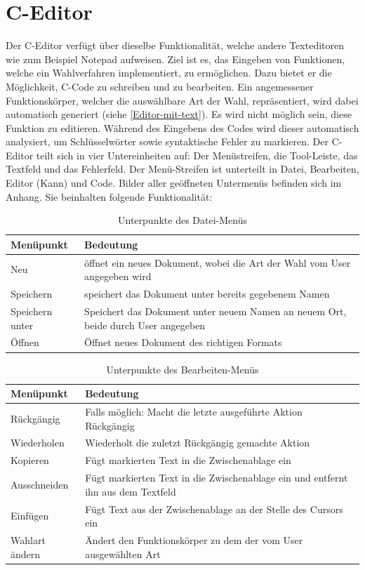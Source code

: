 \documentclass[a4paper]{scrreprt}
\begin{document}
\section{C-Editor}
Der C-Editor verfügt über dieselbe Funktionalität, welche andere Texteditoren wie zum Beispiel Notepad aufweisen. Ziel ist es, das Eingeben von Funktionen, welche ein Wahlverfahren implementiert, zu ermöglichen. Dazu bietet er die Möglichkeit, C-Code zu schreiben und zu bearbeiten. Ein angemessener Funktionskörper, welcher die auswählbare Art der Wahl, repräsentiert, wird dabei automatisch generiert (siehe \ref{Editor-mit-text}). Es wird nicht möglich sein, diese Funktion zu editieren. Während des Eingebens des Codes wird dieser automatisch analysiert, um Schlüsselwörter sowie syntaktische Fehler zu markieren. 
Der C-Editor teilt sich in vier Untereinheiten auf: Der Menüstreifen, die Tool-Leiste, das Textfeld und das Fehlerfeld. Der Menü-Streifen ist unterteilt in Datei, Bearbeiten, Editor (Kann) und Code. Bilder aller geöffneten Untermenüs befinden sich im Anhang. Sie beinhalten folgende Funktionalität:

\begin{table}[H]
\begin{tabular}{|p{3cm}|p{12cm}|}
Menüpunkt & Bedeutung \\
\hline
Neu & öffnet ein neues Dokument, wobei die Art der Wahl vom User angegeben wird \\
Speichern & speichert das Dokument unter bereits gegebenem Namen \\
Speichern unter & Speichert das Dokument unter neuem Namen an neuem Ort, beide durch User angegeben \\
Öffnen & Öffnet neues Dokument des richtigen Formats
\end{tabular}
\label{Datei-Menüpunkte}
\caption{Unterpunkte des Datei-Menüs}
\end{table}

\begin{table}[H]
\begin{tabular}{|p{3cm}|p{12cm}|}
Menüpunkt & Bedeutung \\
\hline
Rückgängig & Falls möglich: Macht die letzte ausgeführte Aktion Rückgängig \\
Wiederholen & Wiederholt die zuletzt Rückgängig gemachte Aktion \\
Kopieren & Fügt markierten Text in die Zwischenablage ein \\
Ausschneiden & Fügt markierten Text in die Zwischenablage ein und entfernt ihn aus dem Textfeld \\
Einfügen & Fügt Text aus der Zwischenablage an der Stelle des Cursors ein \\
Wahlart ändern & Ändert den Funktionskörper zu dem der vom User ausgewählten Art
\end{tabular}
\label{Bearbeiten-Menüpunkte}
\caption{Unterpunkte des Bearbeiten-Menüs}
\end{table}
\end{document}
